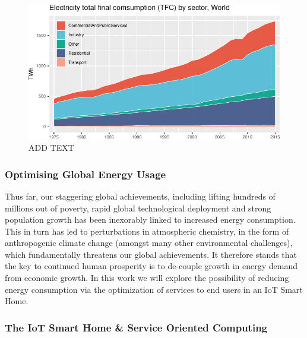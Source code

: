 \documentclass[11pt,]{article}
\begin{document}
\begin{figure}[H]

{\centering \includegraphics{MD_Final_files/figure-latex/sectorEnergyPlot-1} 

}

\caption{ADD TEXT}\label{fig:sectorEnergyPlot}
\end{figure}

\hypertarget{optimising-global-energy-usage}{%
\subsubsection{Optimising Global Energy
Usage}\label{optimising-global-energy-usage}}

Thus far, our staggering global achievements, including lifting hundreds
of millions out of poverty, rapid global technological deployment and
strong population growth has been inexorably linked to increased energy
consumption. This in turn has led to perturbations in atmospheric
chemistry, in the form of anthropogenic climate change (amongst many
other environmental challenges), which fundamentally threatens our
global achievements. It therefore stands that the key to continued human
prosperity is to de-couple growth in energy demand from economic growth.
In this work we will explore the possibility of reducing energy
consumption via the optimization of services to end users in an IoT
Smart Home.

\hypertarget{the-iot-smart-home-service-oriented-computing}{%
\subsubsection{The IoT Smart Home \& Service Oriented
Computing}\label{the-iot-smart-home-service-oriented-computing}}
\end{document}
